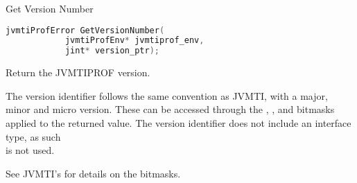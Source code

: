 \begin{apidef}{Get Version Number}
\begin{lstlisting}[language=C]
jvmtiProfError GetVersionNumber(
            jvmtiProfEnv* jvmtiprof_env,
            jint* version_ptr);
\end{lstlisting}

\begin{apidesc}
Return the JVMTIPROF version.

\medskip
The version identifier follows the same convention as JVMTI, with a major, minor and micro version. These can be accessed through the , , and  bitmasks applied to the returned value. The version identifier does not include an interface type, as such \\  is not used.

\medskip
See JVMTI's  for details on the bitmasks.
\end{apidesc}

\begin{apiphase}
\apiphaseany
\end{apiphase}

\begin{apicap}
\apicaprequired
\end{apicap}

\begin{apiparam}
\end{apiparam}

\begin{apierror}
\end{apierror}
\end{apidef}
